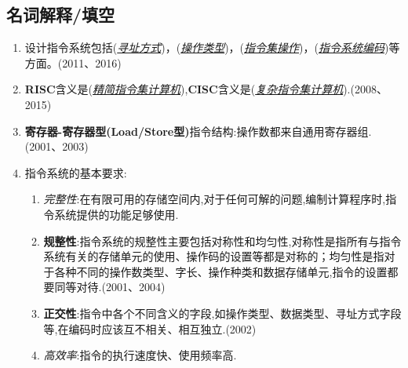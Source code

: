 \documentclass[a4paper]{ctexart}
\newcommand{\blank}[1]{(\emph{\underline{#1}})}
\begin{document}
\subsection{名词解释/填空}
\begin{enumerate}
  \item 设计指令系统包括\blank{寻址方式}，\blank{操作类型}，\blank{指令集操作}，\blank{指令系统编码}等方面。(2011、2016)
  \item \textbf{RISC}含义是\blank{精简指令集计算机},\textbf{CISC}含义是\blank{复杂指令集计算机}.(2008、2015)
  \item \textbf{寄存器-寄存器型(Load/Store型)}指令结构:操作数都来自通用寄存器组.(2001、2003)
  \item 指令系统的基本要求:
  \begin{enumerate}
    \item \emph{完整性}:在有限可用的存储空间内,对于任何可解的问题,编制计算程序时,指令系统提供的功能足够使用.
    \item \textbf{规整性}:指令系统的规整性主要包括对称性和均匀性,对称性是指所有与指令系统有关的存储单元的使用、操作码的设置等都是对称的；均匀性是指对于各种不同的操作数类型、字长、操作种类和数据存储单元,指令的设置都要同等对待.(2001、2004)
    \item \textbf{正交性}:指令中各个不同含义的字段,如操作类型、数据类型、寻址方式字段等,在编码时应该互不相关、相互独立.(2002)
    \item \emph{高效率}:指令的执行速度快、使用频率高.
  \end{enumerate}
\end{enumerate}
\end{document}
